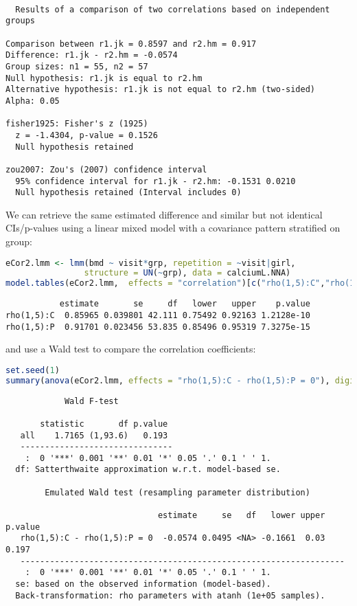 \documentclass[12pt]{article}
\begin{document}
\label{}
\begin{verbatim}

  Results of a comparison of two correlations based on independent groups

Comparison between r1.jk = 0.8597 and r2.hm = 0.917
Difference: r1.jk - r2.hm = -0.0574
Group sizes: n1 = 55, n2 = 57
Null hypothesis: r1.jk is equal to r2.hm
Alternative hypothesis: r1.jk is not equal to r2.hm (two-sided)
Alpha: 0.05

fisher1925: Fisher's z (1925)
  z = -1.4304, p-value = 0.1526
  Null hypothesis retained

zou2007: Zou's (2007) confidence interval
  95% confidence interval for r1.jk - r2.hm: -0.1531 0.0210
  Null hypothesis retained (Interval includes 0)
\end{verbatim}

We can retrieve the same estimated difference and similar but not
identical CIs/p-values using a linear mixed model with a covariance
pattern stratified on group:
\begin{lstlisting}[language=r,numbers=none]
eCor2.lmm <- lmm(bmd ~ visit*grp, repetition = ~visit|girl,
                structure = UN(~grp), data = calciumL.NNA)
model.tables(eCor2.lmm,  effects = "correlation")[c("rho(1,5):C","rho(1,5):P"),]
\end{lstlisting}

\label{}
\begin{verbatim}
           estimate       se     df   lower   upper    p.value
rho(1,5):C  0.85965 0.039801 42.111 0.75492 0.92163 1.2128e-10
rho(1,5):P  0.91701 0.023456 53.835 0.85496 0.95319 7.3275e-15
\end{verbatim}


and use a Wald test to compare the correlation coefficients:
\begin{lstlisting}[language=r,numbers=none]
set.seed(1)
summary(anova(eCor2.lmm, effects = "rho(1,5):C - rho(1,5):P = 0"), digits = 4)
\end{lstlisting}

\label{}
\begin{verbatim}
            Wald F-test 

       statistic       df p.value  
   all    1.7165 (1,93.6)   0.193  
   ------------------------------- 
    :  0 '***' 0.001 '**' 0.01 '*' 0.05 '.' 0.1 ' ' 1.
  df: Satterthwaite approximation w.r.t. model-based se. 

		Emulated Wald test (resampling parameter distribution) 

                               estimate     se   df   lower upper p.value  
   rho(1,5):C - rho(1,5):P = 0  -0.0574 0.0495 <NA> -0.1661  0.03   0.197  
   ------------------------------------------------------------------ 
    :  0 '***' 0.001 '**' 0.01 '*' 0.05 '.' 0.1 ' ' 1.
  se: based on the observed information (model-based). 
  Back-transformation: rho parameters with atanh (1e+05 samples).
\end{verbatim}
\end{document}

